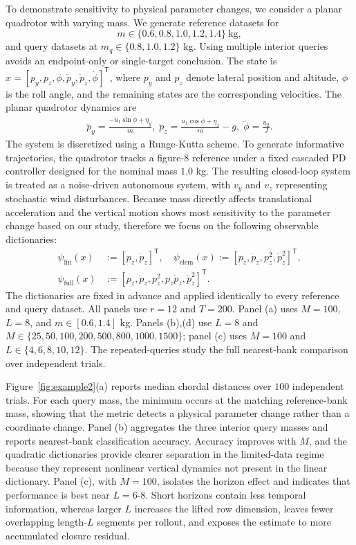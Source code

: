 \documentclass[letterpaper, 10 pt, conference]{ieeeconf}  %
\newcommand{\T}{^{\mathsf T}}
\begin{document}
To demonstrate sensitivity to physical parameter changes, we consider a planar quadrotor with varying mass. We generate reference datasets for
\[
  m\in\{0.6,0.8,1.0,1.2,1.4\}\ \mathrm{kg},
\]
and query datasets at $m_q\in\{0.8,1.0,1.2\}$ kg. Using multiple interior queries avoids an endpoint-only or single-target conclusion.
The state is $x=[p_y,p_z,\phi,\dot p_y,\dot p_z,\dot\phi]\T$, where $p_y$ and $p_z$ denote lateral position and altitude, $\phi$ is the roll angle, and the remaining states are the corresponding velocities. The planar quadrotor dynamics are
\begin{equation}
\begin{aligned}
  \ddot p_y=\frac{-u_1\sin\phi+\eta_y}{m}, \;
  \ddot p_z=\frac{u_1\cos\phi+\eta_z}{m}-g, \;
  \ddot\phi=\frac{u_2}{J}.
\end{aligned}
\label{eq:quadrotor_dynamics}
\end{equation}
The system is discretized using a Runge-Kutta scheme. To generate informative trajectories, the quadrotor tracks a figure-8 reference under a fixed cascaded PD controller designed for the nominal mass $1.0$ kg. The resulting closed-loop system is treated as a noise-driven autonomous system, with $v_y$ and $v_z$ representing stochastic wind disturbances.
Because mass directly affects translational acceleration and the vertical motion shows most sensitivity to the parameter change based on our study, therefore we focus on the following observable dictionaries:
\[
\begin{aligned}
  \psi_{\mathrm{lin}}(x)
    &:=[p_z,\dot p_z]\T,\quad
  \psi_{\mathrm{elem}}(x)
    :=[p_z,\dot p_z,p_z^2,\dot p_z^2]\T,\\
  \psi_{\mathrm{full}}(x)
    &:=[p_z,\dot p_z,p_z^2,p_z\dot p_z,\dot p_z^2]\T.
\end{aligned}
\]
The dictionaries are fixed in advance and applied identically to every reference and query dataset. All panels use $r=12$ and $T=200$. Panel (a) uses $M=100$, $L=8$, and $m\in[0.6,1.4]$ kg. Panels (b),(d) use $L=8$ and $M\in\{25,50,100,200,500,800,1000,1500\}$; panel (c) uses $M=100$ and $L\in\{4,6,8,10,12\}$. The repeated-queries study the full nearest-bank comparison over independent trials.

Figure~\ref{fig:example2}(a) reports median chordal distances over $100$ independent trials. For each query mass, the minimum occurs at the matching reference-bank mass, showing that the metric detects a physical parameter change rather than a coordinate change. Panel (b) aggregates the three interior query masses and reports nearest-bank classification accuracy. Accuracy improves with $M$, and the quadratic dictionaries provide clearer separation in the limited-data regime because they represent nonlinear vertical dynamics not present in the linear dictionary. Panel (c), with $M=100$, isolates the horizon effect and indicates that performance is best near $L=6$-$8$. Short horizons contain less temporal information, whereas larger $L$ increases the lifted row dimension, leaves fewer overlapping length-$L$ segments per rollout, and exposes the estimate to more accumulated closure residual.
\end{document}
